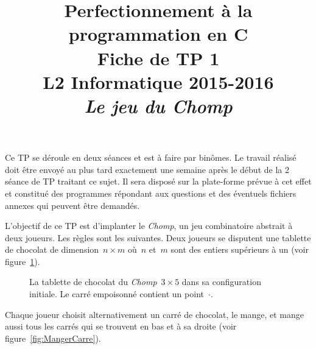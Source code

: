 \documentclass[12pt]{article}
\date{}
\title{{\bf Perfectionnement à la programmation en {\sf C}} \\
    Fiche de TP 1 \\
    {\small L2 Informatique 2015-2016} \\
    {\it \small Le jeu du Chomp}}
\theoremstyle{definition}
\begin{document}
\maketitle

Ce TP se déroule en deux séances et est à faire par binômes.
Le travail réalisé doit être envoyé au plus tard exactement une
semaine après le début de la 2\ieme{} séance de TP traitant ce sujet. Il
sera disposé sur la plate-forme prévue à cet effet et constitué des
programmes répondant aux questions et des éventuels fichiers annexes qui
peuvent être demandés.
\bigskip
\bigskip

L'objectif de ce TP est d'implanter le {\em Chomp}, un jeu combinatoire
abstrait à deux joueurs. Les règles sont les suivantes. Deux joueurs se
disputent une tablette de chocolat de dimension~$n \times m$ où~$n$ et~$m$
sont des entiers supérieurs à un (voir figure~\ref{fig:Chomp3x5}).
\begin{figure}[ht]
    \centering
    \caption{La tablette de chocolat du {\em Chomp}~$3 \times 5$
    dans sa configuration initiale. Le carré empoisonné contient un
    point~$\cdot$.}
    \label{fig:Chomp3x5}
\end{figure}
Chaque joueur choisit alternativement un carré de chocolat, le mange, et
mange aussi tous les carrés qui se trouvent en bas et à sa droite
(voir figure~\ref{fig:MangerCarre}).
\end{document}
